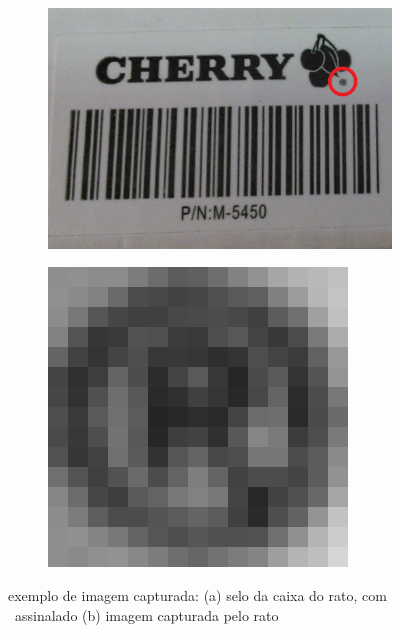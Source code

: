 \documentclass[a4paper]{article}
\begin{document}
\begin{figure}[h]
	\centering
	\begin{subfigure}[b]{0.40\textwidth}
		\centering
		\includegraphics[width=\linewidth]{box_pic}
		\caption{}
		\label{fig:Cherry_box}
	\end{subfigure}
	\begin{subfigure}[b]{0.40\textwidth}
		\centering
		\includegraphics[width=\linewidth]{rprintscreen}
		\caption{}
		\label{fig:registed_capture}
	\end{subfigure}
	\caption{exemplo de imagem capturada: (a) selo da caixa do rato, com \textregistered\ assinalado (b) imagem capturada pelo rato}
\end{figure}
\end{document}
